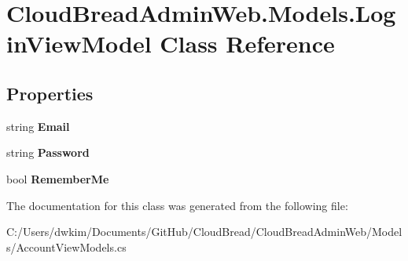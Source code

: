 \hypertarget{class_cloud_bread_admin_web_1_1_models_1_1_login_view_model}{}\section{Cloud\+Bread\+Admin\+Web.\+Models.\+Login\+View\+Model Class Reference}
\label{class_cloud_bread_admin_web_1_1_models_1_1_login_view_model}
\subsection*{Properties}
\begin{DoxyCompactItemize}
\item 
string {\bfseries Email}\hypertarget{class_cloud_bread_admin_web_1_1_models_1_1_login_view_model_a9e3d87fdc3cac69d57579b44b1799a2b}{}\label{class_cloud_bread_admin_web_1_1_models_1_1_login_view_model_a9e3d87fdc3cac69d57579b44b1799a2b}

\item 
string {\bfseries Password}\hypertarget{class_cloud_bread_admin_web_1_1_models_1_1_login_view_model_aa2b8e9a7f680dec9ac624f89f2208913}{}\label{class_cloud_bread_admin_web_1_1_models_1_1_login_view_model_aa2b8e9a7f680dec9ac624f89f2208913}

\item 
bool {\bfseries Remember\+Me}\hypertarget{class_cloud_bread_admin_web_1_1_models_1_1_login_view_model_aa142135ee422191302a762c6341e2286}{}\label{class_cloud_bread_admin_web_1_1_models_1_1_login_view_model_aa142135ee422191302a762c6341e2286}

\end{DoxyCompactItemize}


The documentation for this class was generated from the following file\+:\begin{DoxyCompactItemize}
\item 
C\+:/\+Users/dwkim/\+Documents/\+Git\+Hub/\+Cloud\+Bread/\+Cloud\+Bread\+Admin\+Web/\+Models/Account\+View\+Models.\+cs\end{DoxyCompactItemize}
